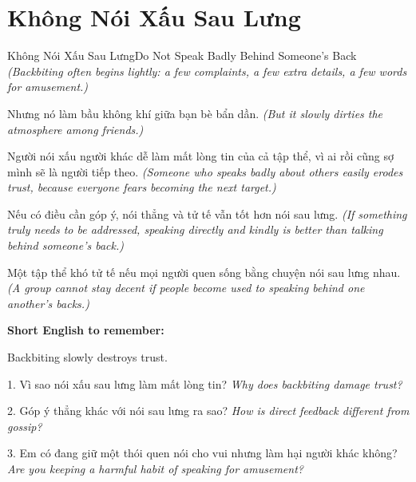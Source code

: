 \section{Không Nói Xấu Sau Lưng}
\begin{truyen}{Không Nói Xấu Sau Lưng}{Do Not Speak Badly Behind Someone's Back}
\textit{(Backbiting often begins lightly: a few complaints, a few extra details, a few words for amusement.)}

Nhưng nó làm bầu không khí giữa bạn bè bẩn dần.
\textit{(But it slowly dirties the atmosphere among friends.)}

Người nói xấu người khác dễ làm mất lòng tin của cả tập thể, vì ai rồi cũng sợ mình sẽ là người tiếp theo.
\textit{(Someone who speaks badly about others easily erodes trust, because everyone fears becoming the next target.)}

Nếu có điều cần góp ý, nói thẳng và tử tế vẫn tốt hơn nói sau lưng.
\textit{(If something truly needs to be addressed, speaking directly and kindly is better than talking behind someone's back.)}
\end{truyen}

\begin{baihoc}
Một tập thể khó tử tế nếu mọi người quen sống bằng chuyện nói sau lưng nhau.
\textit{(A group cannot stay decent if people become used to speaking behind one another's backs.)}
\end{baihoc}

\begin{ghinhoanh}
\textbf{Short English to remember:}

Backbiting slowly destroys trust.

\end{ghinhoanh}

\begin{tuhocnhanh}
1. Vì sao nói xấu sau lưng làm mất lòng tin? \textit{Why does backbiting damage trust?}

2. Góp ý thẳng khác với nói sau lưng ra sao? \textit{How is direct feedback different from gossip?}

3. Em có đang giữ một thói quen nói cho vui nhưng làm hại người khác không? \textit{Are you keeping a harmful habit of speaking for amusement?}
\end{tuhocnhanh}
\ngancach

